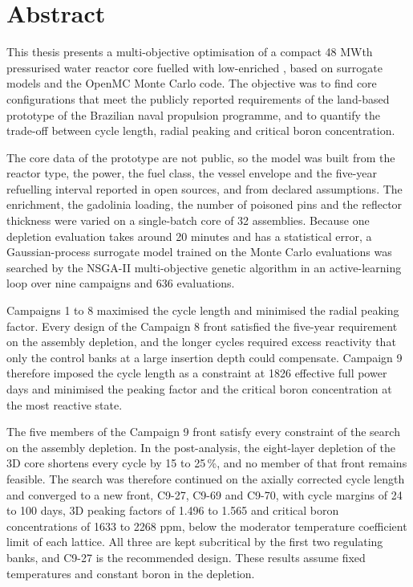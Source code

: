 \chapter*{Abstract}
\thispagestyle{specialheader}
\markboth{}{}
This thesis presents a multi-objective optimisation of a compact 48 MWth
pressurised water reactor core fuelled with low-enriched , based
on surrogate models and the OpenMC Monte Carlo code. The objective was to find
core configurations that meet the publicly reported requirements of the land-based prototype of the Brazilian naval propulsion
programme, and to quantify the trade-off
between cycle length, radial peaking and critical boron concentration.

The core data of the prototype are not public, so the model was built from the reactor type, the power, the fuel class, the vessel envelope and the five-year refuelling interval reported in open sources, and from declared assumptions. The enrichment, the gadolinia loading, the number of poisoned pins and the reflector
thickness were varied on a single-batch core of 32 assemblies. Because one
depletion evaluation takes around 20 minutes and has a statistical
error, a Gaussian-process surrogate model trained on the Monte Carlo
evaluations was searched by the NSGA-II multi-objective genetic algorithm
in an active-learning loop over nine campaigns and
636 evaluations.

Campaigns 1 to 8 maximised the cycle length and minimised the radial
peaking factor. Every design of the Campaign 8 front satisfied the five-year requirement on the assembly depletion, and the longer cycles required excess reactivity that only the control banks at a large insertion depth could compensate. Campaign 9 therefore imposed the cycle length as a constraint at 1826 effective full power days and minimised the peaking factor and the critical boron concentration at the most reactive state.

The five members of the Campaign 9 front satisfy every constraint of the search on the assembly depletion. In the post-analysis, the eight-layer depletion of the 3D core shortens every cycle by 15 to 25\,\%, and no member of that front remains feasible. The search was therefore continued on the axially corrected cycle length and converged to a new front, C9-27, C9-69 and C9-70, with cycle margins of 24 to 100 days, 3D peaking factors of 1.496 to 1.565 and critical boron concentrations of 1633 to 2268 ppm, below the moderator temperature coefficient limit of each lattice. All three are kept subcritical by the first two regulating banks, and C9-27 is the recommended design. These results assume fixed temperatures and constant boron in the depletion.
